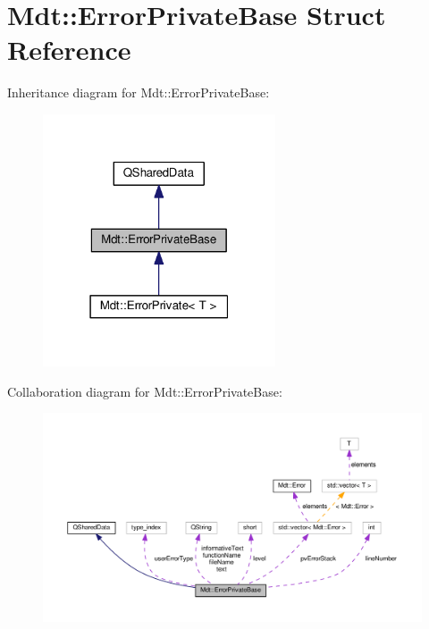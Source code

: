 \hypertarget{struct_mdt_1_1_error_private_base}{}\section{Mdt\+:\+:Error\+Private\+Base Struct Reference}
\label{struct_mdt_1_1_error_private_base}


Inheritance diagram for Mdt\+:\+:Error\+Private\+Base\+:
\nopagebreak
\begin{figure}[H]
\begin{center}
\leavevmode
\includegraphics[width=195pt]{struct_mdt_1_1_error_private_base__inherit__graph}
\end{center}
\end{figure}


Collaboration diagram for Mdt\+:\+:Error\+Private\+Base\+:
\nopagebreak
\begin{figure}[H]
\begin{center}
\leavevmode
\includegraphics[width=350pt]{struct_mdt_1_1_error_private_base__coll__graph}
\end{center}
\end{figure}

